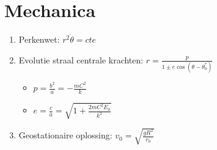 \documentclass[12pt]{article}
\begin{document}
    \maketitle
	
    \section{Mechanica}
    \label{sec:mechanica}
    
    \begin{enumerate}
	    \item Perkenwet: $ r^2 \dot{\theta} = cte $
	    \item Evolutie straal centrale krachten: $ r = \frac{p}{1\pm e \cos{(\theta - \theta_0^{*} )}} $
	    \begin{itemize}
		    \item $ p = \frac{b^2}{a} = - \frac{mC^2}{k} $
		    \item  $ e = \frac{c}{a} = \sqrt{ 1 + \frac{2mC^2 E_0}{k^2} }$
	    \end{itemize}
    \item Geostationaire oplossing: $ v_0 = \sqrt{ \frac{gR^2}{r_0} }$ 
    \end{enumerate}
    
\end{document}
